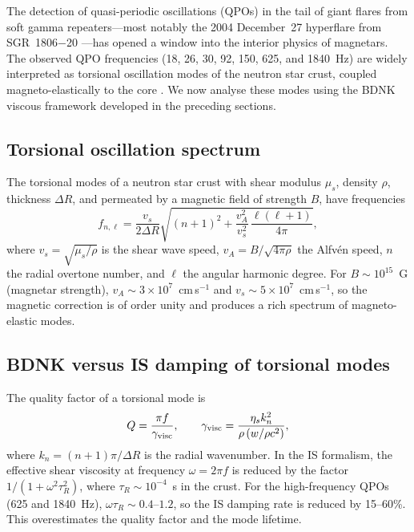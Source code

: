 The detection of quasi-periodic oscillations (QPOs) in the tail of
giant flares from soft gamma repeaters---most notably the 2004 December~27
hyperflare from SGR~1806$-$20 \cite{Israel2005,Watts2006}---has opened a
window into the interior physics of magnetars.  The observed QPO
frequencies (18, 26, 30, 92, 150, 625, and 1840~Hz) are widely
interpreted as torsional oscillation modes of the neutron star crust,
coupled magneto-elastically to the core
\cite{Strohmayer2005,DR11_BDNKtwoSphere2025}.  We now analyse these modes
using the BDNK viscous framework developed in the preceding sections.

\subsection{Torsional oscillation spectrum}

The torsional modes of a neutron star crust with shear modulus $\mu_s$,
density $\rho$, thickness $\Delta R$, and permeated by a magnetic field
of strength $B$, have frequencies
\begin{equation}\label{eq:deep11-torsional-freq}
  f_{n,\ell}
  = \frac{v_s}{2\Delta R}
    \sqrt{(n+1)^{2} + \frac{v_A^{2}}{v_s^{2}}\,
    \frac{\ell(\ell+1)}{4\pi}},
\end{equation}
where $v_s = \sqrt{\mu_s/\rho}$ is the shear wave speed, $v_A =
B/\sqrt{4\pi\rho}$ the Alfv\'en speed, $n$ the radial overtone number,
and $\ell$ the angular harmonic degree.  For $B \sim 10^{15}$~G
(magnetar strength), $v_A \sim 3 \times 10^{7}$~cm\,s$^{-1}$ and
$v_s \sim 5 \times 10^{7}$~cm\,s$^{-1}$, so the magnetic correction
is of order unity and produces a rich spectrum of magneto-elastic modes.

\subsection{BDNK versus IS damping of torsional modes}

The quality factor of a torsional mode is
\begin{equation}\label{eq:deep11-Q-factor}
  Q = \frac{\pi f}{\gamma_{\rm visc}},
  \qquad
  \gamma_{\rm visc} = \frac{\eta_s k_n^{2}}{\rho\,(w/\rho c^{2})},
\end{equation}
where $k_n = (n+1)\pi/\Delta R$ is the radial wavenumber.  In the IS
formalism, the effective shear viscosity at frequency $\omega = 2\pi f$
is reduced by the factor $1/(1 + \omega^{2}\tau_R^{2})$, where
$\tau_R \sim 10^{-4}$~s in the crust.  For the high-frequency QPOs
(625 and 1840~Hz), $\omega\tau_R \sim 0.4$--$1.2$, so the IS
damping rate is reduced by 15--60\%.  This overestimates the quality
factor and the mode lifetime.

